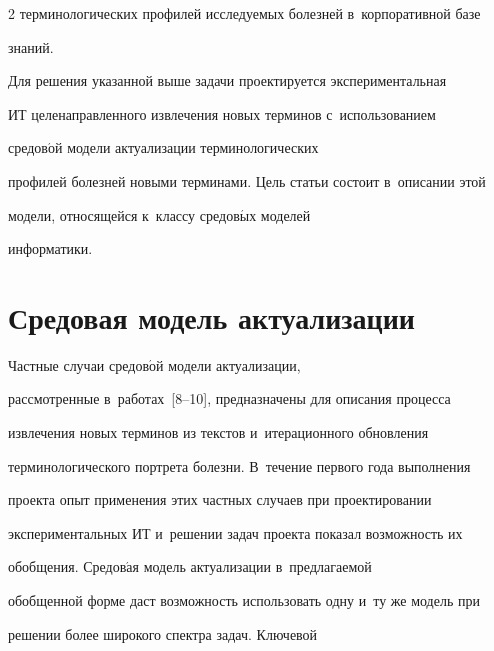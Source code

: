 \begin{multicols}{2}
терминологических профилей исследуемых болезней в~корпоративной базе 

знаний.

  

  Для решения указанной выше задачи проектируется экспериментальная 

ИТ целенаправленного извлечения новых терминов с~использованием 

средов$\acute{\mbox{о}}$й модели актуализации \mbox{терминологических} 

профилей болезней новыми терминами. Цель \mbox{статьи} состоит в~описании этой 

модели, относящейся к~классу средов$\acute{\mbox{ы}}$х моделей 

информатики.



\vspace*{-6pt}

  

\section{Средовая модель актуализации}



\vspace*{-4pt}



  Частные случаи средов$\acute{\mbox{о}}$й модели актуализации, 

рассмотренные в~работах~[8--10], предназначены для описания процесса 

извлечения новых терминов из текстов и~итерационного обновления 

терминологического портрета болезни. В~течение первого года выполнения 

проекта опыт применения этих частных случаев при проектировании 

экспериментальных ИТ и~решении задач проекта показал возможность их 

обобщения. Средов$\acute{\mbox{а}}$я модель актуализации в~предлагаемой 

обобщенной форме даст возможность использовать одну и~ту же модель при 

решении более широкого спектра задач. Ключевой\linebreak\vspace*{-12pt}



\pagebreak



\end{multicols}



